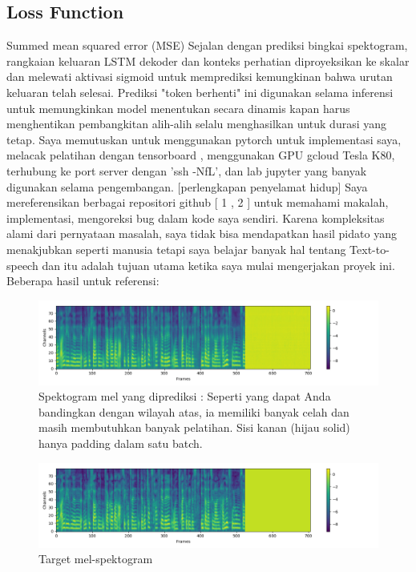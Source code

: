 \subsection{Loss Function}
Summed mean squared error (MSE)
Sejalan dengan prediksi bingkai spektogram, rangkaian keluaran LSTM dekoder dan konteks perhatian diproyeksikan ke skalar dan melewati aktivasi sigmoid untuk memprediksi kemungkinan bahwa urutan keluaran telah selesai. Prediksi "token berhenti" ini digunakan selama inferensi untuk memungkinkan model menentukan secara dinamis kapan harus menghentikan pembangkitan alih-alih selalu menghasilkan untuk durasi yang tetap.
Saya memutuskan untuk menggunakan pytorch untuk implementasi saya, melacak pelatihan dengan tensorboard , menggunakan GPU gcloud Tesla K80, terhubung ke port server dengan 'ssh -NfL', dan lab jupyter yang banyak digunakan selama pengembangan. [perlengkapan penyelamat hidup]
Saya mereferensikan berbagai repositori github [ 1 , 2 ] untuk memahami makalah, implementasi, mengoreksi bug dalam kode saya sendiri. Karena kompleksitas alami dari pernyataan masalah, saya tidak bisa mendapatkan hasil pidato yang menakjubkan seperti manusia tetapi saya belajar banyak hal tentang Text-to-speech dan itu adalah tujuan utama ketika saya mulai mengerjakan proyek ini.
Beberapa hasil untuk referensi:
\begin{figure}[H]
        \centerline{\includegraphics[scale=.35]{figures/ref1}}
        \caption{Spektogram mel yang diprediksi : Seperti yang dapat Anda bandingkan dengan wilayah atas, ia memiliki banyak celah dan masih membutuhkan banyak pelatihan. Sisi kanan (hijau solid) hanya padding dalam satu batch.}
		\label{ref1}
\end{figure}
\begin{figure}[H]
        \centerline{\includegraphics[scale=.35]{figures/ref2}}
        \caption{Target mel-spektogram}
		\label{ref2}
\end{figure}
